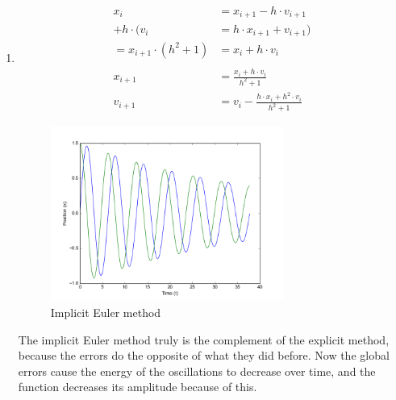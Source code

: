 \documentclass[11pt]{article}
\begin{document}
\begin{enumerate}
\item
\begin{align*}
x_i &= x_{i+1} - h \cdot v_{i+1} \\
+ h \cdot (v_i &= h \cdot x_{i+1} + v_{i+1}) \\
= x_{i+1} \cdot (h^2 + 1) &= x_i + h \cdot v_i \\ \\
x_{i+1} &= \frac{x_i + h \cdot v_i}{h^2 + 1} \\
v_{i+1} &= v_i - \frac{h \cdot x_i + h^2 \cdot v_i}{h^2 + 1}
\end{align*}
\begin{figure}[h]
\centering
\includegraphics[width=3in]{img/implicit.png}
\caption{Implicit Euler method}
\end{figure}
The implicit Euler method truly is the complement of the explicit method, because the errors do the opposite of what they did before. Now the global errors cause the energy of the oscillations to decrease over time, and the function decreases its amplitude because of this. 

\end{enumerate}
\end{document}
